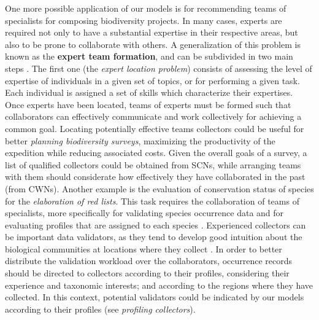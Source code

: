 One more possible application of our models is for recommending teams of specialists for composing biodiversity projects.
In many cases, experts are required not only to have a substantial expertise in their respective areas, but also to be prone to collaborate with others.
%
A generalization of this problem is known as the \textbf{expert team formation}, and can be subdivided in two main steps \cite{Lappas2011}.
The first one (the \textit{expert location problem}) consists of assessing the level of expertise of individuals in a given set of topics, or for performing a given task.
Each individual is assigned a set of skills which characterize their expertises.
Once experts have been located, teams of experts must be formed such that collaborators can effectively communicate and work collectively for achieving a common goal.
%
Locating potentially effective teams collectors could be useful for better \textit{planning biodiversity surveys}, maximizing the productivity of the expedition while reducing associated costs.
Given the overall goals of a survey, a list of qualified collectors could be obtained from SCNs, while arranging teams with them should considerate how effectively they have collaborated in the past (from CWNs).  
%
Another example is the evaluation of conservation status of species for the \textit{elaboration of red lists}.
This task requires the collaboration of teams of specialists, more specifically for validating species occurrence data and for evaluating profiles that are assigned to each species \cite{Martinelli2013}.
Experienced collectors can be important data validators, as they tend to develop good intuition about the biological communities at locations where they collect \cite{Noss1996}.
In order to better distribute the validation workload over the collaborators, occurrence records should be directed to collectors according to their profiles, considering their experience and taxonomic interests; and according to the regions where they have collected.
In this context, potential validators could be indicated by our models according to their profiles (see \textit{profiling collectors}).



